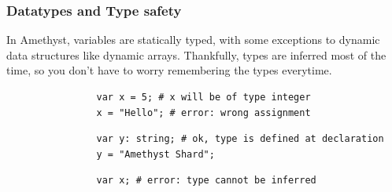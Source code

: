 \documentclass[12pt]{article}
\begin{document}
        \subsubsection{Datatypes and Type safety}
            In Amethyst, variables are statically typed, with some exceptions to dynamic data structures like dynamic arrays. Thankfully, types are inferred most of the time, so you don't have to worry remembering the types everytime.
            
            \begin{lstlisting}
                var x = 5; # x will be of type integer
                x = "Hello"; # error: wrong assignment
            \end{lstlisting}
            
            \begin{lstlisting}
                var y: string; # ok, type is defined at declaration
                y = "Amethyst Shard";
            \end{lstlisting}
            
            \begin{lstlisting}
                var x; # error: type cannot be inferred
            \end{lstlisting}
                
\end{document}
